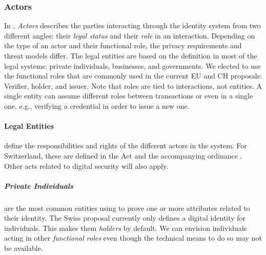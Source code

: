\subsubsection{Actors}
\label{subsub:actors}

In \emph{\rot}, \emph{Actors} describes the parties interacting through the identity system from two different angles: their \emph{legal status} and their \emph{role} in an interaction.
Depending on the type of an actor and their functional role, the privacy requirements and threat models differ.
The legal entities are based on the definition in most of the legal systems: private individuals, businesses, and governments.
We elected to use the functional roles that are commonly used in the current EU and CH proposals: Verifier, holder, and issuer.
Note that roles are tied to interactions, not entities. 
A single entity can assume different roles between transactions or even in a single one. e.g., verifying a credential in order to issue a new one.


\vspace{1em}


\paragraph{Legal Entities} define the responsibilities and rights of the different actors in the system.
For Switzerland, these are defined in the \eid Act \cite{BGEID24} and the accompanying ordinance \cite{VEID25}.
Other acts related to digital security will also apply.

\subparagraph{Private Individuals}
are the most common entities using \eid to prove one or more attributes related to their identity.
The Swiss proposal currently only defines a digital identity for individuals.
This makes them \emph{holders} by default. We can envision individuals acting in other \emph{functional roles} even though the technical means to do so may not be available.

